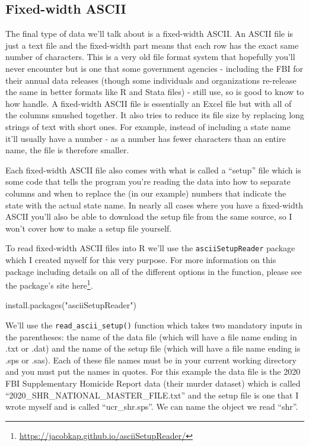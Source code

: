 \documentclass[
]{krantz}
\makeatletter
\newenvironment{Shaded}{\begin{snugshade}}{\end{snugshade}}
\newcommand{\FunctionTok}[1]{\textcolor[rgb]{0,0,0}{#1}}
\newcommand{\NormalTok}[1]{#1}
\newcommand{\StringTok}[1]{\textcolor[rgb]{0.5,0.5,0.5}{#1}}
\renewcommand{\href}[2]{#2\footnote{\url{#1}}}
\newenvironment{kframe}{%
\medskip{}
\setlength{\fboxsep}{.8em}
 \def\at@end@of@kframe{}%
 \ifinner\ifhmode%
  \def\at@end@of@kframe{\end{minipage}}%
  \begin{minipage}{\columnwidth}%
 \fi\fi%
 \def\FrameCommand##1{\hskip\@totalleftmargin \hskip-\fboxsep
 \colorbox{shadecolor}{##1}\hskip-\fboxsep
     \hskip-\linewidth \hskip-\@totalleftmargin \hskip\columnwidth}%
 \MakeFramed {\advance\hsize-\width
   \@totalleftmargin\z@ \linewidth\hsize
   \@setminipage}}%
 {\par\unskip\endMakeFramed%
 \at@end@of@kframe}
\renewenvironment{Shaded}{\begin{kframe}}{\end{kframe}}
\makeatother
\begin{document}
\hypertarget{fixed-width-ascii}{%
\subsection{Fixed-width ASCII}\label{fixed-width-ascii}}

The final type of data we'll talk about is a fixed-width ASCII. An ASCII file is just a text file and the fixed-width part means that each row has the exact same number of characters. This is a very old file format system that hopefully you'll never encounter but is one that some government agencies - including the FBI for their annual data releases (though some individuals and organizations re-release the same in better formats like R and Stata files) - still use, so is good to know to how handle. A fixed-width ASCII file is essentially an Excel file but with all of the columns smushed together. It also tries to reduce its file size by replacing long strings of text with short ones. For example, instead of including a state name it'll usually have a number - as a number has fewer characters than an entire name, the file is therefore smaller.

Each fixed-width ASCII file also comes with what is called a ``setup'' file which is some code that tells the program you're reading the data into how to separate columns and when to replace the (in our example) numbers that indicate the state with the actual state name. In nearly all cases where you have a fixed-width ASCII you'll also be able to download the setup file from the same source, so I won't cover how to make a setup file yourself.

To read fixed-width ASCII files into R we'll use the \texttt{asciiSetupReader} package which I created myself for this very purpose. For more information on this package including details on all of the different options in the function, please see the package's site \href{https://jacobkap.github.io/asciiSetupReader/}{here}.

\begin{Shaded}
\begin{Highlighting}[]
\FunctionTok{install.packages}\NormalTok{(}\StringTok{"asciiSetupReader"}\NormalTok{)}
\end{Highlighting}
\end{Shaded}

We'll use the \texttt{read\_ascii\_setup()} function which takes two mandatory inputs in the parentheses: the name of the data file (which will have a file name ending in .txt or .dat) and the name of the setup file (which will have a file name ending is .sps or .sas). Each of these file names must be in your current working directory and you must put the names in quotes. For this example the data file is the 2020 FBI Supplementary Homicide Report data (their murder dataset) which is called ``2020\_SHR\_NATIONAL\_MASTER\_FILE.txt'' and the setup file is one that I wrote myself and is called ``ucr\_shr.sps''. We can name the object we read ``shr''.
\end{document}
